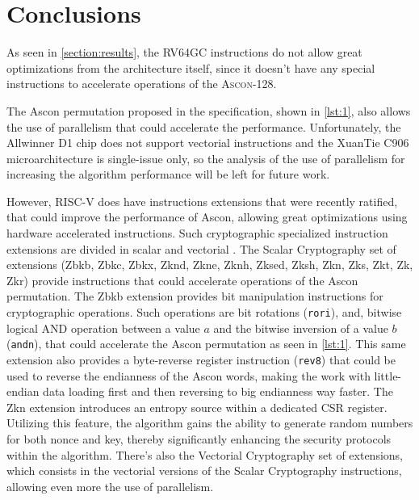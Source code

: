 \documentclass[11pt,twoside]{article}
\begin{document}
\section{Conclusions}

As seen in \cref{section:results}, the \textsf{RV64GC} instructions do not allow great optimizations from the architecture itself, since it doesn't have any special instructions to accelerate operations of the \textsc{Ascon-128}.

The Ascon permutation proposed in the specification, shown in \cref{lst:1}, also allows the use of parallelism that could accelerate the performance. Unfortunately, the Allwinner D1 chip does not support vectorial instructions and the XuanTie C906 microarchitecture is single-issue only, so the analysis of the use of parallelism for increasing the algorithm performance will be left for future work.

However, RISC-V does have instructions extensions that were recently ratified, that could improve the performance of Ascon, allowing great optimizations using hardware accelerated instructions. Such cryptographic specialized instruction extensions are divided in scalar \cite{riscvCryptoVol1} and vectorial \cite{riscvCryptoVol2}. The Scalar Cryptography set of extensions (Zbkb, Zbkc, Zbkx, Zknd, Zkne, Zknh, Zksed, Zksh, Zkn, Zks, Zkt, Zk, Zkr) provide instructions that could accelerate operations of the Ascon permutation. The Zbkb extension provides bit manipulation instructions for cryptographic operations. Such operations are bit rotations (\texttt{rori}), and, bitwise logical AND operation between a value $a$ and the bitwise inversion of a value $b$ (\texttt{andn}), that could accelerate the Ascon permutation as seen in \cref{lst:1}. This same extension also provides a byte-reverse register instruction (\texttt{rev8}) that could be used to reverse the endianness of the Ascon words, making the work with little-endian data loading first and then reversing to big endianness way faster. The Zkn extension introduces an entropy source within a dedicated CSR register. Utilizing this feature, the algorithm gains the ability to generate random numbers for both nonce and key, thereby significantly enhancing the security protocols within the algorithm. There's also the Vectorial Cryptography set of extensions, which consists in the vectorial versions of the Scalar Cryptography instructions, allowing even more the use of parallelism.

\printbibliography
\end{document}
